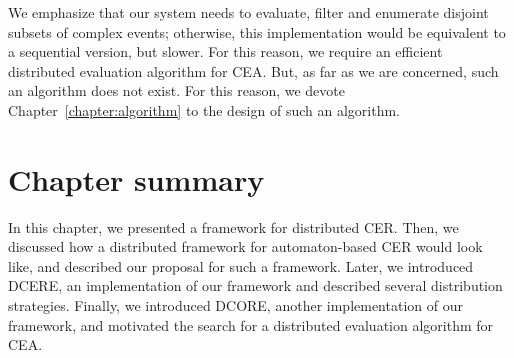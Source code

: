 We emphasize that our system needs to evaluate, filter and enumerate disjoint subsets of complex events; otherwise, this implementation would be equivalent to a sequential version, but slower. For this reason, we require an efficient distributed evaluation algorithm for CEA. But, as far as we are concerned, such an algorithm does not exist. For this reason, we devote Chapter~\ref{chapter:algorithm} to the design of such an algorithm.

\section{Chapter summary}

In this chapter, we presented a framework for distributed CER. Then, we discussed how a distributed framework for automaton-based CER would look like, and described our proposal for such a framework. Later, we introduced DCERE, an implementation of our framework and described several distribution strategies. Finally, we introduced DCORE, another implementation of our framework, and motivated the search for a distributed evaluation algorithm for CEA.
